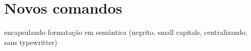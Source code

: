 \section{Novos comandos}\label{sec:comandos}

encapsulando formatação em semântica (negrito, small capitals,
centralizando, sans  typewritter)

